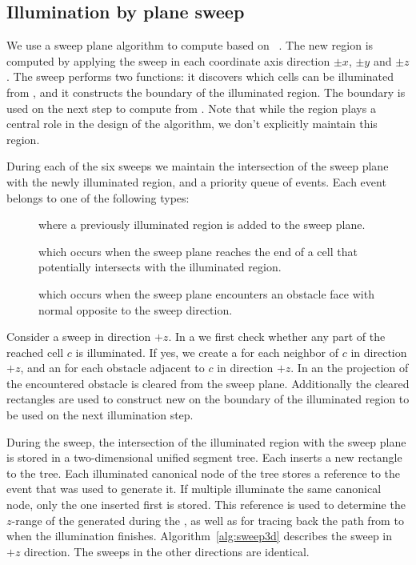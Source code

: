 \documentclass[english,gradu]{tktltiki2018}
\begin{document}
\subsection{Illumination by plane sweep}

We use a sweep plane algorithm to compute  based on ~\cite{restricted}.
The new region is computed by applying the sweep in each coordinate axis direction $\pm x$, $\pm y$ and $\pm z$.
The sweep performs two functions: it discovers which cells can be illuminated from , and it constructs the boundary of the illuminated region.
The boundary is used on the next step to compute  from .
Note that while the region  plays a central role in the design of the algorithm, we don't explicitly maintain this region.

During each of the six sweeps we maintain the intersection of the sweep plane with the newly illuminated region, and a priority queue of events.
Each event belongs to one of the following types:

\begin{description}
\item[\addE] where a previously illuminated region is added to the sweep plane.
\item[\cellE] which occurs when the sweep plane reaches the end of a cell that potentially intersects with the illuminated region.
\item[\obsE] which occurs when the sweep plane encounters an obstacle face with normal opposite to the sweep direction.
\end{description}

Consider a sweep in direction $+z$.
In a \cellE we first check whether any part of the reached cell $c$ is illuminated.
If yes, we create a \cellE for each neighbor of $c$ in direction $+z$, and an \obsE for each obstacle adjacent to $c$ in direction $+z$.
In an \obsE the projection of the encountered obstacle is cleared from the sweep plane.
Additionally the cleared rectangles are used to construct new \addEs on the boundary of the illuminated region to be used on the next illumination step.

During the sweep, the intersection of the illuminated region with the sweep plane is stored in a two-dimensional unified segment tree.
Each \addE inserts a new rectangle to the tree.
Each illuminated canonical node of the tree stores a reference to the event that was used to generate it.
If multiple \addEs illuminate the same canonical node, only the one inserted first is stored.
This reference is used to determine the $z$-range of the \addEs generated during the \obsEs, as well as for tracing back the path from \ept to \spt when the illumination finishes.
Algorithm~\ref{alg:sweep3d} describes the sweep in $+z$ direction.
The sweeps in the other directions are identical.
\end{document}
